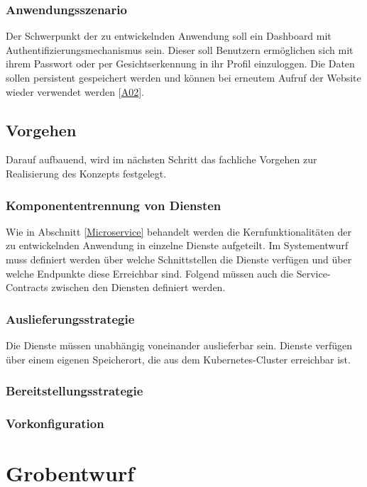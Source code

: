 \subsubsection{Anwendungsszenario}\label{Anwendungsszenario}

Der Schwerpunkt der zu entwickelnden Anwendung soll ein Dashboard mit Authentifizierungsmechanismus sein. 
Dieser soll Benutzern ermöglichen sich mit ihrem Passwort oder per Gesichtserkennung in ihr Profil einzuloggen. 
Die Daten sollen persistent gespeichert werden und können bei erneutem Aufruf der Website wieder verwendet werden [\hyperlink{A02}{A02}]. 

\subsection{Vorgehen}
Darauf aufbauend, wird im nächsten Schritt das fachliche Vorgehen zur Realisierung des Konzepts festgelegt.

\subsubsection{Komponententrennung von Diensten}
Wie in Abschnitt \ref{Microservice} behandelt werden die Kernfunktionalitäten der zu entwickelnden Anwendung  in einzelne Dienste aufgeteilt.
Im Systementwurf muss definiert werden über welche Schnittstellen die Dienste verfügen und über welche Endpunkte diese Erreichbar sind.
Folgend müssen auch die Service-Contracts zwischen den Diensten definiert werden.

\subsubsection{Auslieferungsstrategie}
Die Dienste müssen unabhängig voneinander auslieferbar sein.
Dienste verfügen über einem eigenen Speicherort, die aus dem Kubernetes-Cluster erreichbar ist.

\subsubsection{Bereitstellungsstrategie}

\subsubsection{Vorkonfiguration}


\section{Grobentwurf}

